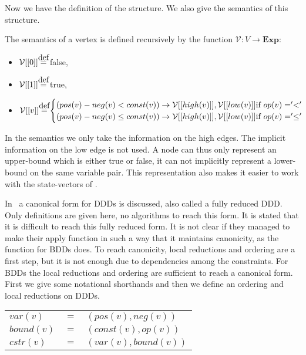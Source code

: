 Now we have the definition of the structure. We also give the semantics of this structure. 

\begin{mydef}
\label{def:Semantics1}
The semantics of a vertex is defined recursively by the function $\mathcal{V}: V \rightarrow \textbf{Exp}:$
\begin{itemize}
\item $\mathcal{V}[[0]] \myeq$ false,
\item $\mathcal{V}[[1]] \myeq$ true,
\item \begin{math} \mathcal{V}[[v]] \myeq
\begin{cases}
(pos(v) - neg(v) < const(v)) \rightarrow \mathcal{V}[[high(v)]],\mathcal{V}[[low(v)]]\text{if }op(v) = '<'\\
(pos(v) - neg(v) \leq const(v)) \rightarrow \mathcal{V}[[high(v)]],\mathcal{V}[[low(v)]]\text{if }op(v) = '\leq'
\end{cases}
\end{math}
\end{itemize}
\end{mydef}

In the semantics we only take the information on the high edges. The implicit information on the low edge is not used. A node can thus only represent an upper-bound which is either true or false, it can not implicitly represent a lower-bound on the same variable pair. This representation also makes it easier to work with the state-vectors of \ltsmin{}.

In~\cite{ddds} a canonical form for DDDs is discussed, also called a fully reduced DDD. Only definitions are given here, no algorithms to reach this form. It is stated that it is difficult to reach this fully reduced form. It is not clear if they managed to make their apply function in such a way that it maintains canonicity, as the function for BDDs does. To reach canonicity, local reductions and ordering are a first step, but it is not enough due to dependencies among the constraints. For BDDs the local reductions and ordering are sufficient to reach a canonical form. First we give some notational shorthands and then we define an ordering and local reductions on DDDs.
%
\begin{center}
\begin{tabular}{lll}
$var(v)$   & $=$ & $(pos(v),neg(v))$   \\
$bound(v)$ & $=$ & $(const(v),op(v))$  \\
$cstr(v)$  & $=$ & $(var(v),bound(v))$
\end{tabular}
\end{center}

